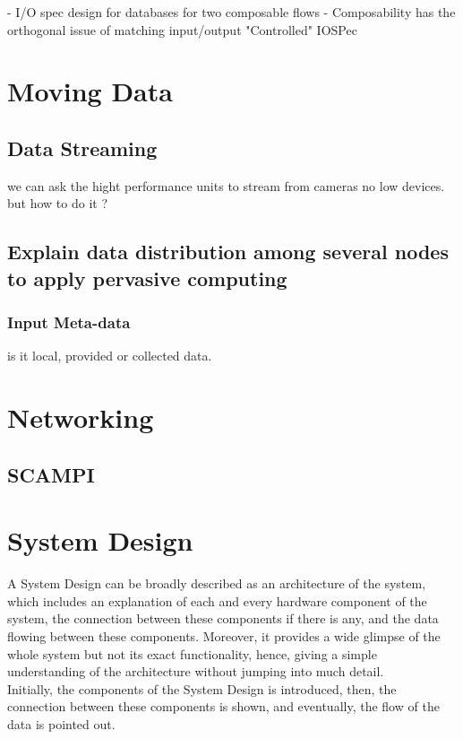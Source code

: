\newpage

- I/O spec design for databases for two composable flows
 - Composability has the orthogonal issue of matching input/output "Controlled" IOSPec


\section{Moving Data}

\subsection{Data Streaming}
we can ask the hight performance units to stream from cameras no low devices. but how to do it ?

\subsection{Explain data distribution among several nodes to apply pervasive computing}

\subsubsection{Input Meta-data}
is it local, provided or collected data.

\section{Networking}

\subsection{SCAMPI }

\section{System Design }
A System Design can be broadly described as an architecture of the system, which includes an explanation of each and every hardware component of the system, the connection between these components if there is any, and the data flowing between these components. Moreover, it provides a wide glimpse of the whole system but not its exact functionality, hence, giving a simple understanding of the architecture without jumping into much detail.\\
Initially, the components of the System Design is introduced, then, the connection between these components is shown, and eventually, the flow of the data is pointed out.

